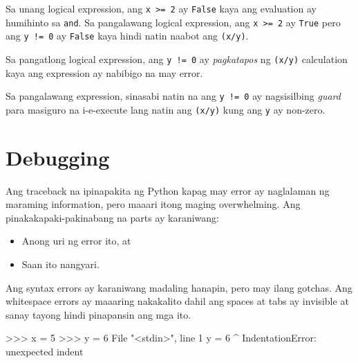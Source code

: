 \documentclass[10pt,]{book}
\newenvironment{Shaded}{}{}
\newcommand{\DecValTok}[1]{\textcolor[rgb]{0.25,0.63,0.44}{#1}}
\newcommand{\NormalTok}[1]{#1}
\newcommand{\OperatorTok}[1]{\textcolor[rgb]{0.40,0.40,0.40}{#1}}
\newcommand{\PreprocessorTok}[1]{\textcolor[rgb]{0.74,0.48,0.00}{#1}}
\newcommand{\StringTok}[1]{\textcolor[rgb]{0.25,0.44,0.63}{#1}}
\begin{document}
Sa unang logical expression, ang \texttt{x\ \textgreater{}=\ 2} ay
\texttt{False} kaya ang evaluation ay humihinto sa \texttt{and}. Sa
pangalawang logical expression, ang \texttt{x\ \textgreater{}=\ 2} ay
\texttt{True} pero ang \texttt{y\ !=\ 0} ay \texttt{False} kaya hindi
natin naabot ang \texttt{(x/y)}.

Sa pangatlong logical expression, ang \texttt{y\ !=\ 0} ay
\emph{pagkatapos} ng \texttt{(x/y)} calculation kaya ang expression ay
nabibigo na may error.

Sa pangalawang expression, sinasabi natin na ang \texttt{y\ !=\ 0} ay
nagsisilbing \emph{guard} para masiguro na i-e-execute lang natin ang
\texttt{(x/y)} kung ang \texttt{y} ay non-zero.

\section{Debugging}\label{debugging-2}

 

Ang traceback na ipinapakita ng Python kapag may error ay naglalaman ng
maraming information, pero maaari itong maging overwhelming. Ang
pinakakapaki-pakinabang na parts ay karaniwang:

\begin{itemize}
\item
  Anong uri ng error ito, at
\item
  Saan ito nangyari.
\end{itemize}

Ang syntax errors ay karaniwang madaling hanapin, pero may ilang
gotchas. Ang whitespace errors ay maaaring nakakalito dahil ang spaces
at tabs ay invisible at sanay tayong hindi pinapansin ang mga ito.


\begin{Shaded}
\begin{Highlighting}[]
\OperatorTok{\textgreater{}\textgreater{}\textgreater{}}\NormalTok{ x }\OperatorTok{=} \DecValTok{5}
\OperatorTok{\textgreater{}\textgreater{}\textgreater{}}\NormalTok{  y }\OperatorTok{=} \DecValTok{6}
\NormalTok{  File }\StringTok{"\textless{}stdin\textgreater{}"}\NormalTok{, line }\DecValTok{1}
\NormalTok{    y }\OperatorTok{=} \DecValTok{6}
    \OperatorTok{\^{}}
\PreprocessorTok{IndentationError}\NormalTok{: unexpected indent}
\end{Highlighting}
\end{Shaded}
\end{document}
